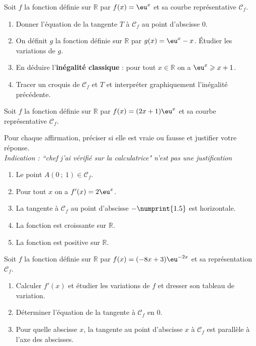 \documentclass[main.tex]{subfiles}
\begin{document}
\begin{exercise}\label{chapter06:exercice:exp:derivation3} Soit $f$ la fonction définie sur $\mathbb{R}$ par  $f(x)=\eu^x$ et sa courbe représentative $\mathscr{C}_f$. 
	\begin{enumerate}[label={\arabic*)},leftmargin=*]
		\item Donner l'équation de la tangente $T$ à $\mathscr{C}_f$ au point d'abscisse $0$.
		\item On définit $g$ la fonction définie sur $\mathbb{R}$ par $g(x)=\eu^x-x$. Étudier les variations de $g$.
		\item En déduire l'\textbf{inégalité classique} :  pour tout $x\in\mathbb{R}$ on a $\eu^x\geqslant x+1$.
		\item Tracer un croquis de $\mathscr{C}_f$ et $T$ et interpréter graphiquement l'inégalité précédente. 
	\end{enumerate}
\end{exercise}
 \begin{exercise}\label{chapter06:exercice:exp:derivation4}
 Soit $f$ la fonction définie sur $\mathbb{R}$ par $f(x)=(2x+1)\eu^x$ et sa courbe représentative $\mathscr{C}_f$.
 
Pour chaque affirmation, préciser si elle est vraie ou fausse et justifier votre réponse.\\
\emph{Indication : ``chef j'ai vérifié sur la calculatrice" n'est pas une justification}
\begin{enumerate}[label={Affirmation \no \arabic*},leftmargin=*]
	\item \og Le point $A(0~;~1)\in\mathscr{C}_f$.\fg	
	\item \og Pour tout $x$ on a $f'(x)=2\eu^x$.\fg
	\item \og La tangente à $\mathscr{C}_f$ au point d'abscisse $-\numprint{1.5}$ est horizontale.\fg
	\item \og La fonction est croissante sur $\mathbb{R}$.\fg
	\item \og La fonction est positive sur $\mathbb{R}$.\fg
\end{enumerate}
 \end{exercise}
  \begin{exercise}\label{chapter06:exercice:exp:derivation5} 
 	Soit $f$ la fonction définie sur $\mathbb{R}$ par $f(x)=(-8x+3)\eu^{-2x}$ et sa représentation $\mathscr{C}_f$.
 	\begin{enumerate}[label={\arabic*)},leftmargin=*]
 		\item  Calculer $f'(x)$ et étudier les variations de $f$ et dresser son tableau de variation.
 		\item Déterminer l'équation de la tangente à $\mathscr{C}_f$ en $0$.
 		\item Pour quelle abscisse $x$, la tangente au point d'abscisse $x$ à $\mathscr{C}_f$ est parallèle à l'axe des abscisses.
 	\end{enumerate}
 \end{exercise}
 
\end{document}

